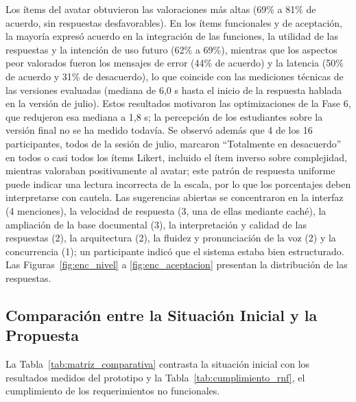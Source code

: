 Los ítems del avatar obtuvieron las valoraciones más altas (69\% a 81\% de acuerdo, sin respuestas desfavorables). En los ítems funcionales y de aceptación, la mayoría expresó acuerdo en la integración de las funciones, la utilidad de las respuestas y la intención de uso futuro (62\% a 69\%), mientras que los aspectos peor valorados fueron los mensajes de error (44\% de acuerdo) y la latencia (50\% de acuerdo y 31\% de desacuerdo), lo que coincide con las mediciones técnicas de las versiones evaluadas (mediana de 6,0 s hasta el inicio de la respuesta hablada en la versión de julio). Estos resultados motivaron las optimizaciones de la Fase 6, que redujeron esa mediana a 1,8 s; la percepción de los estudiantes sobre la versión final no se ha medido todavía. Se observó además que 4 de los 16 participantes, todos de la sesión de julio, marcaron ``Totalmente en desacuerdo'' en todos o casi todos los ítems Likert, incluido el ítem inverso sobre complejidad, mientras valoraban positivamente al avatar; este patrón de respuesta uniforme puede indicar una lectura incorrecta de la escala, por lo que los porcentajes deben interpretarse con cautela. Las sugerencias abiertas se concentraron en la interfaz (4 menciones), la velocidad de respuesta (3, una de ellas mediante caché), la ampliación de la base documental (3), la interpretación y calidad de las respuestas (2), la arquitectura (2), la fluidez y pronunciación de la voz (2) y la concurrencia (1); un participante indicó que el sistema estaba bien estructurado. Las Figuras~\ref{fig:enc_nivel} a \ref{fig:enc_aceptacion} presentan la distribución de las respuestas.



\subsection{Comparación entre la Situación Inicial y la Propuesta}
La Tabla~\ref{tab:matriz_comparativa} contrasta la situación inicial con los resultados medidos del prototipo y la Tabla~\ref{tab:cumplimiento_rnf}, el cumplimiento de los requerimientos no funcionales.

